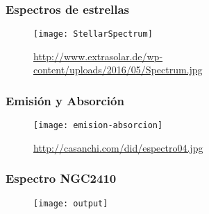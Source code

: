 \documentclass{beamer}
\begin{document}
	\begin{frame}
	\frametitle{Espectros de estrellas}
	\begin{figure}
	\texttt{[image: StellarSpectrum]}
	\caption{\tiny{\url{http://www.extrasolar.de/wp-content/uploads/2016/05/Spectrum.jpg}}}
	\end{figure}

	\end{frame}
	\begin{frame}
	\frametitle{Emisión y Absorción}
	\begin{figure}
	\texttt{[image: emision-absorcion]}
	\caption{\tiny{\url{http://casanchi.com/did/espectro04.jpg}}}
	\end{figure}
	\end{frame}
	\begin{frame}
	\frametitle{Espectro NGC2410}
	\begin{figure}
	\texttt{[image: output]}
	\end{figure}
	\end{frame}
	
\end{document}
